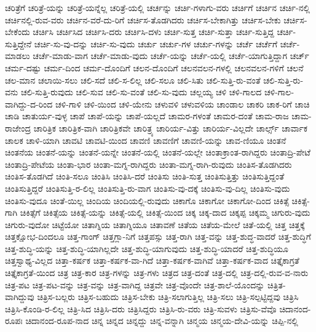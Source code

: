 {ಚರಿತ್ರೆಗೆ
ಚರಿತ್ರೆ-ಯನ್ನು
ಚರಿತ್ರೆ-ಯನ್ನೆಲ್ಲ
ಚರಿತ್ರೆ-ಯಲ್ಲಿ
ಚರ್ಚನ್ನು
ಚರ್ಚಿ-ಗಳಾಗು-ವರು
ಚರ್ಚಿಗೆ
ಚರ್ಚಿನ
ಚರ್ಚಿ-ನಲ್ಲಿ
ಚರ್ಚಿನಲ್ಲಿ-ರುವ-ವರು
ಚರ್ಚಿನ-ವರೆ-ದು-ರಿಗೆ
ಚರ್ಚಿಸ-ತೊಡಗಿದರು
ಚರ್ಚಿಸ-ಬೇಕಾಗಿತ್ತು
ಚರ್ಚಿಸ-ಬೇಕು
ಚರ್ಚಿಸ-ಬೇಕೆಂದು
ಚರ್ಚಿಸಿ
ಚರ್ಚಿಸಿದ
ಚರ್ಚಿಸಿ-ದರು
ಚರ್ಚಿಸಿ-ದಳು
ಚರ್ಚಿ-ಸುತ್ತ
ಚರ್ಚಿ-ಸುತ್ತಾ
ಚರ್ಚಿ-ಸುತ್ತಿದ್ದ
ಚರ್ಚಿ-ಸುತ್ತಿದ್ದೇನೆ
ಚರ್ಚಿ-ಸು-ವು-ದನ್ನು
ಚರ್ಚಿ-ಸು-ವುದು
ಚರ್ಚು
ಚರ್ಚು-ಗಳ
ಚರ್ಚು-ಗಳನ್ನು
ಚರ್ಚೆ
ಚರ್ಚೆಗೆ
ಚರ್ಚೆ-ಮಾಡಲು
ಚರ್ಚೆ-ಮಾಡು-ವಾಗ
ಚರ್ಚೆ-ಮಾಡು-ವುದು
ಚರ್ಚೆ-ಯನ್ನು
ಚರ್ಚೆ-ಯಲ್ಲಿ
ಚರ್ಚೆ-ಯಾಗುತ್ತಿದ್ದಾಗ
ಚರ್ಚ್
ಚರ್ಮ-ದಷ್ಟು
ಚರ್ಮ-ದಿಂದ
ಚರ್ಮ-ದೊಂದಿಗೆ
ಚಲನ-ದೊಂದಿಗೆ
ಚಲನವಲನ-ಗಳಲ್ಲಿ
ಚಲನವಲನ-ಗಳಿಗೆ
ಚಲನೆ
ಚಲ-ಮಾನ
ಚಲಾಯಿ-ಸಲು
ಚಲಿ-ಸದೆ
ಚಲಿ-ಸ-ಲಿಲ್ಲ
ಚಲಿ-ಸಲೂ
ಚಲಿ-ಸಿತು
ಚಲಿ-ಸುತ್ತಿ-ರು-ವಂತೆ
ಚಲಿ-ಸುತ್ತಿ-ರು-ವನು
ಚಲಿ-ಸುತ್ತಿ-ರುವುದು
ಚಲಿ-ಸುವ
ಚಲಿ-ಸು-ವಂತೆ
ಚಲಿ-ಸು-ವುದು
ಚಲ್ಲಯ್ಯ
ಚಳಿ
ಚಳಿ-ಗಾಲದ
ಚಳಿ-ಗಾಲ-ವಾಗಿದ್ದು-ದ-ರಿಂದ
ಚಳಿ-ಗಾಳಿ
ಚಳಿ-ಯಿಂದ
ಚಳಿ-ಯೇನು
ಚಳುವಳಿ
ಚಳುವಳಿಯ
ಚಾಂಡಾಲ
ಚಾಕರಿ
ಚಾಕ-ರಿಗೆ
ಚಾಚಿ
ಚಾಡಿ
ಚಾತುರ್ಯ-ವುಳ್ಳ
ಚಾಪೆ
ಚಾಪೆ-ಯನ್ನು
ಚಾಪೆ-ಯಲ್ಲದೆ
ಚಾಮರ-ಗಳಂತೆ
ಚಾಮರ-ದಂತೆ
ಚಾಮ-ರಾಜ
ಚಾಮ-ರಾಜೇಂದ್ರ
ಚಾರಿತ್ರಿಕ
ಚಾರಿತ್ರಿಕ-ವಾಗಿ
ಚಾರಿತ್ರಿಕವೇ
ಚಾರಿತ್ರ್ಯ
ಚಾರಿರ್ಯ-ವಿತ್ತು
ಚಾರಿರ್ಯ-ವಿಲ್ಲದೇ
ಚಾರ್ಲ್ಸ್
ಚಾರ್ವಾಕ
ಚಾಲಕ
ಚಾಳಿ-ಯಾಗಿ
ಚಾವಟಿ
ಚಾವಟಿ-ಯಿಂದ
ಚಾವಣಿ
ಚಾವಣಿಗೆ
ಚಾವಣಿ-ಯನ್ನು
ಚಾವ-ಣಿಯೂ
ಚಿಂತನೆ
ಚಿಂತನೆಯ
ಚಿಂತನೆ-ಯನ್ನು
ಚಿಂತನೆ-ಯನ್ನೇ
ಚಿಂತನೆ-ಯಲ್ಲಿ
ಚಿಂತನೆ-ಯಲ್ಲೇ
ಚಿಂತಾಕ್ರಾಂತ-ರಾಗಿದ್ದರು
ಚಿಂತಾದ್ರಿ-ಪೇಟೆ
ಚಿಂತಾದ್ರಿ-ಪೇಟೆಯ
ಚಿಂತಾ-ಭಾರ
ಚಿಂತಾ-ಮಗ್ನ-ರಾಗಿದ್ದರು
ಚಿಂತಾ-ಮಗ್ನ-ರಾಗಿ-ರುವುದು
ಚಿಂತಿಸ-ತೊಡಗಿದರು
ಚಿಂತಿಸ-ತೊಡಗಿದೆ
ಚಿಂತಿ-ಸಲೂ
ಚಿಂತಿಸಿ
ಚಿಂತಿಸಿ-ದರೆ
ಚಿಂತಿಸು
ಚಿಂತಿ-ಸುತ್ತ
ಚಿಂತಿಸುತ್ತಿತ್ತು
ಚಿಂತಿಸುತ್ತಿದ್ದಂತೆ
ಚಿಂತಿಸುತ್ತಿದ್ದರೆ
ಚಿಂತಿಸುತ್ತಿ-ರ-ಲಿಲ್ಲ
ಚಿಂತಿಸುತ್ತಿ-ರು-ವಾಗ
ಚಿಂತಿಸು-ವು-ದಕ್ಕೆ
ಚಿಂತಿಸು-ವು-ದಿಲ್ಲ
ಚಿಂತಿಸು-ವುದು
ಚಿಂತಿಸು-ವುದೂ
ಚಿಂತೆ-ಯಿಲ್ಲ
ಚಿಂದಿಯ
ಚಿಂದಿಯಲ್ಲಿ-ರುವುದು
ಚಿಕಾಗೊ
ಚಿಕಾಗೋ
ಚಿಕಾಗೋ-ದಿಂದ
ಚಿಕಿತ್ಸೆ
ಚಿಕಿತ್ಸೆ-ಗಾಗಿ
ಚಿಕಿತ್ಸೆಗೆ
ಚಿಕಿತ್ಸೆಯ
ಚಿಕಿತ್ಸೆ-ಯನ್ನು
ಚಿಕಿತ್ಸೆ-ಯಲ್ಲಿ
ಚಿಕಿತ್ಸೆ-ಯಿಂದ
ಚಿಕ್ಕ
ಚಿಕ್ಕ-ದಾದ
ಚಿಕ್ಕಪ್ಪ
ಚಿಕ್ಕಮ್ಮ
ಚಿಗುರು-ವುದು
ಚಿಗುರು-ವುದೋ
ಚಿಟ್ಟೆಯೋ
ಚಿತಾಗ್ನಿಯ
ಚಿತಾಗ್ನಿಯೂ
ಚಿತಾವಣೆ
ಚಿತೆಯ
ಚಿತೆಯ-ಮೇಲೆ
ಚಿತೆ-ಯಲ್ಲಿ
ಚಿತ್ತ
ಚಿತ್ತಕ್ಕೆ
ಚಿತ್ತಕ್ಷೋಭ-ದಿಂದಲೂ
ಚಿತ್ತ-ಗಾಂಗ್
ಚಿತ್ತಗ್ಲಾ-ನಿಗೆ
ಚಿತ್ತಪಸ್ಸು
ಚಿತ್ತ-ರಾಗಿ
ಚಿತ್ತ-ವನ್ನು
ಚಿತ್ತ-ಶುದ್ಧ-ವಾದರೆ
ಚಿತ್ತ-ಶುದ್ಧಿಗೆ
ಚಿತ್ತ-ಶುದ್ಧಿ-ಯನ್ನು
ಚಿತ್ತ-ಶುದ್ಧಿ-ಯಾಗಿಲ್ಲದೇ
ಚಿತ್ತ-ಶುದ್ಧಿ-ಯಾಗುವುದು
ಚಿತ್ತ-ಶುದ್ಧಿ-ಯಾದರೆ
ಚಿತ್ತ-ಶುದ್ಧಿಯೂ
ಚಿತ್ತಸ್ವಾಥ್ಯ-ವಿಲ್ಲದ
ಚಿತ್ತಾ-ಕರ್ಷಕ
ಚಿತ್ತಾ-ಕರ್ಷಕ-ವಾ-ಗಿದೆ
ಚಿತ್ತಾ-ಕರ್ಷಕ-ವಾಗಿವೆ
ಚಿತ್ತಾ-ಕರ್ಷಕ-ವಾದ
ಚಿತ್ತೈಕಾಗ್ರತೆ
ಚಿತ್ತೈಕಾಗ್ರತೆ-ಯಿಂದ
ಚಿತ್ರ
ಚಿತ್ರ-ಕಾರ
ಚಿತ್ರ-ಗಳನ್ನು
ಚಿತ್ರ-ಗಳು
ಚಿತ್ರದ
ಚಿತ್ರ-ದಂತೆ
ಚಿತ್ರ-ದಲ್ಲಿ
ಚಿತ್ರ-ದಲ್ಲಿ-ರುವ-ವ-ನಾರು
ಚಿತ್ರ-ಪಟ
ಚಿತ್ರ-ಪಟ-ವನ್ನು
ಚಿತ್ರ-ವನ್ನು
ಚಿತ್ರ-ವಾಗಿದ್ದ
ಚಿತ್ರವೇ
ಚಿತ್ರ-ವೊಂದೇ
ಚಿತ್ರ-ಶಾಲೆ-ಯೊಂದನ್ನು
ಚಿತ್ರಿತ-ವಾಗಿದ್ದುವು
ಚಿತ್ರಿಸ-ಬಲ್ಲರು
ಚಿತ್ರಿಸ-ಬಹುದು
ಚಿತ್ರಿಸ-ಬೇಕು
ಚಿತ್ರಿ-ಸಲಾಗುತ್ತಿಲ್ಲ
ಚಿತ್ರಿ-ಸಲು
ಚಿತ್ರಿ-ಸಲ್ಪಟ್ಟಿದ್ದವು
ಚಿತ್ರಿಸಿ
ಚಿತ್ರಿಸಿ-ಕೊಂಡಿ-ರ-ಲಿಲ್ಲ
ಚಿತ್ರಿ-ಸಿದ
ಚಿತ್ರಿಸಿ-ದರು
ಚಿತ್ರಿಸಿದ್ದರು
ಚಿತ್ರಿಸಿ-ರು-ವರು
ಚಿತ್ರಿ-ಸುವಳು
ಚಿತ್ರಿಸು-ವೆವೊ
ಚಿದಾನಂದ-ರೂಪಃ
ಚಿದಾನಂದ-ರೂಪ-ನಾದ
ಚಿನ್ನ
ಚಿನ್ನದ
ಚಿನ್ನದ್ದು
ಚಿನ್ನ-ವನ್ನಾಗಿ
ಚಿನ್ಮಯ
ಚಿನ್ಮಯ-ದೇವಿ-ಯನ್ನು
ಚಿಪ್ಪಿ-ನಲ್ಲಿ
}
